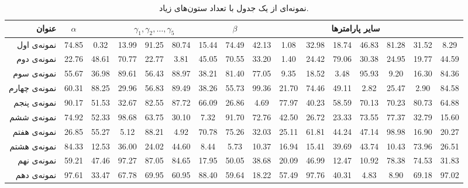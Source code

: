 	
		
		\begin{landscape}
			\begin{table}
				\caption{نمونه‌ای از یک جدول با تعداد ستون‌های زیاد.}
				\label{tbl1}
				\centering
				\footnotesize
				\begin{tabular}{|r||c|c|c|c|c|c|c|c|c|c|c|c|c|c|c|}
				\hline
				\textbf{عنوان} & $\alpha$ & \multicolumn{5}{|c|}{$\gamma_1, \gamma_2, \ldots, \gamma_5$} & $\beta$ & \multicolumn{8}{|c|}{سایر پارامترها} \\ \hline
نمونه‌ی اول 	&   74.85 &  0.32 &  13.99 &  91.25 &  80.74 &  15.44 &  74.49 &  42.13 &  1.08  &  32.98 &  18.74 &  46.83 &  81.28 &  31.52 &  8.29 \\
نمونه‌ی دوم &   22.76 &  48.61 &  70.77 &  22.77 &  3.81 &  45.05 &  70.55 &  33.20 &  1.40  &  24.42 &  79.06 &  30.38 &  24.95 &  19.77 &  44.59 \\
نمونه‌ی سوم &   55.67 &  36.98 &  89.61 &  56.43 &  88.97 &  38.21 &  81.40 &  77.05 &  9.35 &  18.52 &  3.48 &  95.93 &  9.20 &  16.30 &  84.36 \\
نمونه‌ی چهارم &   60.31 &  88.25 &  29.96 &  56.83 &  89.49 &  38.26 &  55.73 &  99.36 &  21.70 &  74.46 &  49.11 &  2.82 &  25.47 &  2.90 &  84.58 \\
نمونه‌ی پنجم &   90.17 &  51.53 &  32.67 &  82.55 &  87.72 &  66.09 &  26.86 &  4.69 &  77.97 &  40.23 &  58.59 &  70.13 &  70.23 &  80.73 &  64.88 \\
نمونه‌ی ششم &   74.92 &  52.33 &  98.68 &  63.75 &  30.10 &  7.32 &  91.70 &  72.76 &  42.50 &  26.72 &  23.33 &  73.55 &  77.37 &  32.79 &  15.60 \\
نمونه‌ی هفتم &   26.85 &  55.27 &  5.12 &  88.21 &  4.92 &  70.78 &  75.26 &  32.03 &  25.11 &  61.81 &  44.24 &  47.14 &  98.98 &  16.90 &  20.27 \\
نمونه‌ی هشتم &   84.33 &  12.53 &  36.00 &  24.02 &  44.60 &  8.44 &  5.73 &  10.37 &  16.94 &  15.41 &  39.69 &  43.74 &  10.43 &  73.96 &  26.51 \\
نمونه‌ی نهم &   59.21 &  47.46 &  97.27 &  87.05 &  84.65 &  17.95 &  50.05 &  38.68 &  20.09 &  46.99 &  12.47 &  10.92 &  78.38 &  74.53 &  31.83 \\
نمونه‌ی دهم &   97.61 &  33.47 &  67.78 &  69.95 &  60.95 &  88.40 &  59.64 &  18.22 &  57.49 &  97.76 &  40.31 &  4.83 &  8.90 &  69.18 &  97.02 \\ \hline
				\end{tabular}
			\end{table}
		\end{landscape}
	
